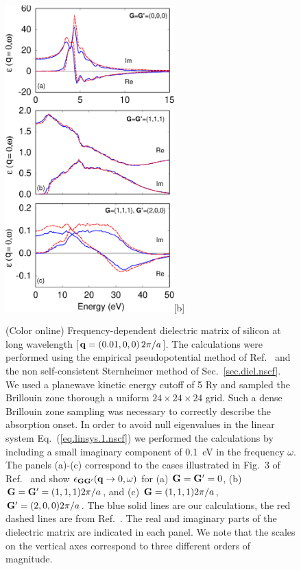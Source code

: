 \documentclass[twocolumn,prb,showpacs,superscriptaddress]{revtex4}
\def\w{\omega}
\def\q{{\bf q}}
\def\G{{\bf G}}
\def\Gp{{\bf G^\prime}}
\begin{document}
\begin  {figure}
\begin  {center}
\includegraphics[width=6.5cm]{fig2.eps}[b]
\end    {center}
\caption{\label{fig2}
        (Color online)
        Frequency-dependent dielectric matrix of silicon at long wavelength [$\q=(0.01,0,0) \, 2\pi/a$].
        The calculations were performed using the empirical pseudopotential method of Ref.\ 
        and the non self-consistent Sternheimer method of Sec.\ \ref{sec.diel.nscf}.
        We used a planewave kinetic energy cutoff of 5 Ry and sampled the Brillouin zone thorough a uniform
        $24\times 24\times 24$ grid. Such a dense Brillouin zone sampling was necessary to correctly describe
        the absorption onset. In order to avoid null eigenvalues in the linear system Eq.\ (\ref{eq.linsys.1.nscf})
        we performed the calculations by including a small imaginary component of 0.1~eV in the frequency $\w$.
        The panels (a)-(c) correspond to the cases illustrated in Fig.\ 3 of Ref.\ 
        and show $\epsilon_{\G\Gp}(\q\rightarrow 0,\w)$ for (a) $\G=\Gp=0$, (b) $\G=\Gp=(1,1,1) 2\pi/a$,
        and (c) $\G=(1,1,1) 2\pi/a$, $\Gp=(2,0,0) 2\pi/a$.
        The blue solid lines are our calculations, the red dashed lines are from Ref.\ .
        The real and imaginary parts of the dielectric matrix are indicated in each panel.
        We note that the scales on the vertical axes correspond to three different orders of magnitude.
        }
\end    {figure}
\end{document}
